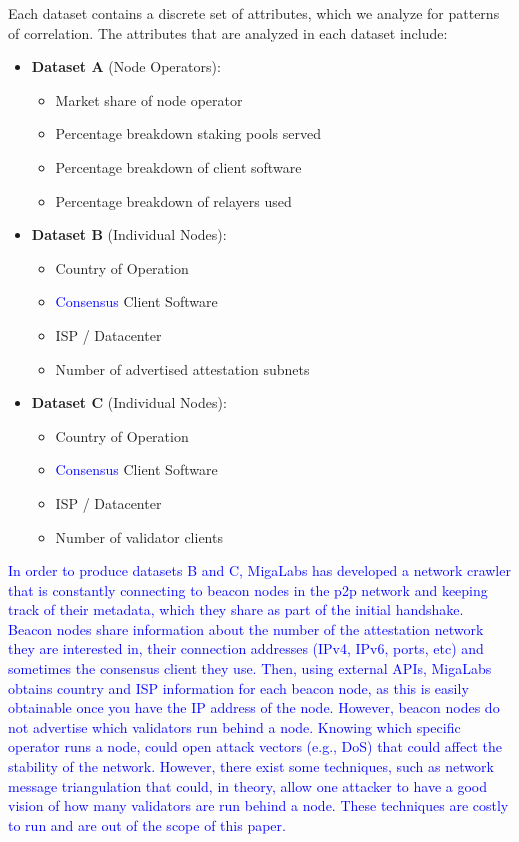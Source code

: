 \documentclass[conference]{IEEEtran}
\newcommand{\leo}[1]{\textcolor{blue}{#1}}
\begin{document}
Each dataset contains a discrete set of attributes, which we analyze for patterns of correlation.  The attributes that are analyzed in each dataset include:

\begin{itemize}
    \item \textbf{Dataset A} (Node Operators):
    \begin{itemize}
        \item Market share of node operator
        \item Percentage breakdown staking pools served
        \item Percentage breakdown of client software
        \item Percentage breakdown of relayers used
    \end{itemize}
    \item \textbf{Dataset B} (Individual Nodes):
            \begin{itemize}
                \item Country of Operation
                \item \leo{Consensus} Client Software
                \item ISP / Datacenter
                \item Number of advertised attestation subnets
            \end{itemize}
    \item \textbf{Dataset C} (Individual Nodes):
            \begin{itemize}
                \item Country of Operation
                \item \leo{Consensus} Client Software
                \item ISP / Datacenter
                \item Number of validator clients
            \end{itemize}
\end{itemize}

\leo{In order to produce datasets B and C, MigaLabs has developed a network crawler that is constantly connecting to beacon nodes in the p2p network and keeping track of their metadata, which they share as part of the initial handshake. Beacon nodes share information about the number of the attestation network they are interested in, their connection addresses (IPv4, IPv6, ports, etc) and sometimes the consensus client they use. Then, using external APIs, MigaLabs obtains country and ISP information for each beacon node, as this is easily obtainable once you have the IP address of the node. However, beacon nodes do not advertise which validators run behind a node. Knowing which specific operator runs a node, could open attack vectors (e.g., DoS) that could affect the stability of the network. However, there exist some techniques, such as network message triangulation that could, in theory, allow one attacker to have a good vision of how many validators are run behind a node. These techniques are costly to run and are out of the scope of this paper. }
\end{document}
